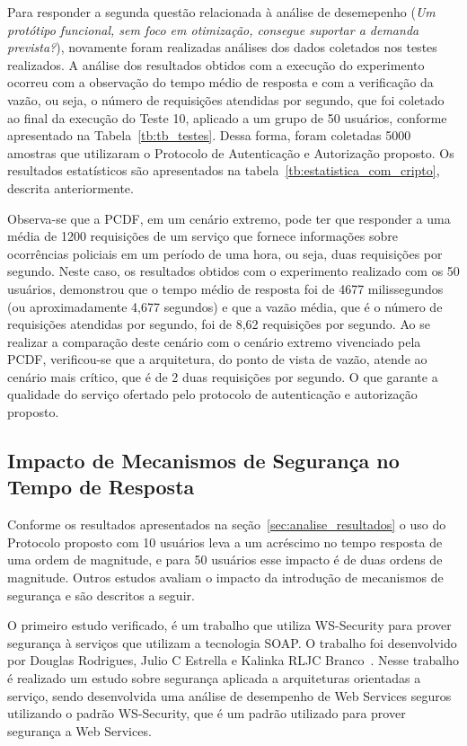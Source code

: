 

Para responder a segunda questão relacionada \`{a} an\'{a}lise de desemepenho (\emph{Um protótipo funcional, sem foco em otimização, consegue suportar a demanda prevista?}), novamente foram realizadas análises dos dados coletados nos testes realizados. A análise dos resultados obtidos com a execução do experimento ocorreu com a observação do tempo médio de resposta e com a verificação da vazão, ou seja, o número de requisições atendidas por segundo, que foi coletado ao final da execução do Teste 10, aplicado a um grupo de 50 usuários, conforme apresentado na Tabela~\ref{tb:tb_testes}. Dessa forma, foram coletadas 5000 amostras que utilizaram o Protocolo de Autenticação e Autorização proposto. Os resultados estatísticos são apresentados na tabela~\ref{tb:estatistica_com_cripto}, descrita anteriormente.

Observa-se que a PCDF, em um cenário extremo, pode ter que responder a uma média de 1200 requisições de um serviço que fornece informações sobre ocorrências policiais em um período de uma hora, ou seja, duas requisições por segundo. Neste caso, os resultados obtidos com o experimento realizado com os 50 usuários, demonstrou que o tempo médio de resposta foi de 4677 milissegundos (ou aproximadamente 4,677 segundos) e que a vazão média, que é o número de requisições atendidas por segundo, foi de 8,62 requisições por segundo. Ao se realizar a comparação deste cenário com o cenário extremo vivenciado pela PCDF, verificou-se que a arquitetura, do ponto de vista de vazão, atende ao cen\'{a}rio mais cr\'{i}tico, que é de 2 duas requisições por segundo. O que garante a qualidade do serviço ofertado pelo protocolo de autenticação e autorização proposto.

\subsection{Impacto de Mecanismos de Segurança no Tempo de Resposta}

Conforme os resultados apresentados na seção~\ref{sec:analise_resultados} o uso do Protocolo proposto com 10 usuários leva a um acréscimo no tempo resposta de uma ordem de magnitude, e para 50 usuários esse impacto é de duas ordens de magnitude. Outros estudos avaliam o impacto da introdução de mecanismos de segurança e são descritos a seguir.

O primeiro estudo verificado, é um trabalho que utiliza WS-Security para prover segurança à serviços que utilizam a tecnologia SOAP. O trabalho foi desenvolvido por Douglas Rodrigues, Julio C Estrella e Kalinka RLJC Branco~\cite{rodrigues2011analysis}. Nesse trabalho é realizado um estudo sobre segurança aplicada a arquiteturas orientadas a serviço, sendo desenvolvida uma análise de desempenho de Web Services seguros utilizando o padrão WS-Security, que é um padrão utilizado para prover segurança a Web Services.

